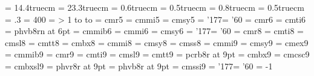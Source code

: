 
\magnification\magstephalf
\hsize = 14.4truecm \vsize = 23.3truecm
\hoffset = 0.6truecm \voffset = 0.5truecm
\topskip = 0.8truecm
\parindent = 0.5truecm \parskip = .3\baselineskip
\tolerance = 400
\headline = {%
    \ifnum\pageno > 1
    \hbox to %
    \else\hbox to \hsize{\hfill}\fi}
%
\newfam\scfam                                                     %
\newfam\bsfam                                              %
\newfam\tbfam                                               %
\newfam\sffam                                                    %
\newfam\sfbfam                                              %
\newfam\sfifam                                            %
\newskip\ttglue
%
\font\fiverm = cmr5
\font\fivei  = cmmi5
\font\fivesy = cmsy5
\skewchar\fivei = '177\skewchar\fivesy = '60
%
\font\sixrm = cmr6
\font\sixit = cmti6
\font\sixbf = phvb8rn at 6pt  %
\font\sixbi = cmmib6
\font\sixi  = cmmi6
\font\sixsy = cmsy6
\skewchar\sixi = '177\skewchar\sixsy = '60
%
\font\eightrm = cmr8
\font\eightit = cmti8
\font\eightsl = cmsl8
\font\eighttt = cmtt8
\font\eightbf = cmbx8
\font\eighti  = cmmi8
\font\eightsy = cmsy8
\font\eightss = cmss8
%
\font\ninei  = cmmi9
\font\ninesy = cmsy9
\font\nineex = cmex9
\font\ninebi = cmmib9
\font\ninerm = cmr9
\font\nineit = cmti9
\font\ninesl = cmsl9
\font\ninett = cmtt9 %
\font\ninetb = pcrb8r at 9pt
\font\ninebf = cmbx9
\font\ninesc = cmcsc9
\font\ninebs = cmbxsl9
\font\niness = phvr8r at 9pt  %
\font\ninesb = phvb8r at 9pt  %
\font\ninesi = cmssi9
\skewchar\ninei = '177\skewchar\ninesy = '60
\hyphenchar\ninett = -1

\ifx\eightpoint\undefined
   \def\eightpoint{%
      \def\rm{\fam0\eightrm}%
      \textfont0 = \eightrm\scriptfont0 = \sixrm  \scriptscriptfont0 = \fiverm%
      \textfont1 = \eighti \scriptfont1 = \sixi   \scriptscriptfont1 = \fivei%
      \textfont2 = \eightsy\scriptfont2 = \sixsy  \scriptscriptfont2 = \fivesy%
      \textfont3 = \tenex  \scriptfont3 = \tenex  \scriptscriptfont3 = \tenex%
      \def\it{\fam\itfam\eightit}\textfont\itfam = \eightit%
      \def\sl{\fam\slfam\eightsl}\textfont\slfam = \eightsl%
      \def\tt{\fam\ttfam\eighttt}\textfont\ttfam = \eighttt%
      \textfont\bffam = \eightbf \scriptfont\bffam = \sixbf%
      \scriptscriptfont\bffam = \fivebf%
      \def\bf{\fam\bffam\eightbf}%
      \def\sf{\fam\sffam\eightss}\textfont\sffam = \eightss%
      \normalbaselineskip = 10pt%
      \setbox\strutbox = \hbox{\vrule height7.5pt depth2.5pt width0pt}%
      \normalbaselines\rm}
\fi

